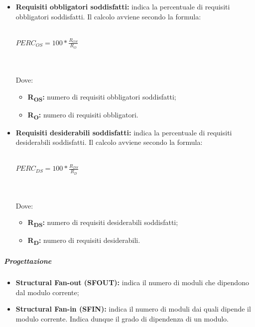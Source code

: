 \begin{itemize}
	\item \textbf{Requisiti obbligatori soddisfatti:} indica la percentuale di requisiti obbligatori soddisfatti. Il calcolo avviene secondo la formula:\\\\
	\centerline{
		\begin{math}
		PERC_{OS}=100*\frac{R_{OS}}{R_O}
		\end{math}
	}
	\\\\Dove:
	\begin{itemize}
		\item \textbf{R\textsubscript{OS}:} numero di requisiti obbligatori soddisfatti;
		\item \textbf{R\textsubscript{O}:} numero di requisiti obbligatori.
	\end{itemize}
	\item \textbf{Requisiti desiderabili soddisfatti:} indica la percentuale di requisiti desiderabili soddisfatti. Il calcolo avviene secondo la formula:\\\\
		\centerline{
		\begin{math}
		PERC_{DS}=100*\frac{R_{DS}}{R_D}
		\end{math}
	}
	\\\\Dove:
	\begin{itemize}
		\item \textbf{R\textsubscript{DS}:} numero di requisiti desiderabili soddisfatti;
		\item \textbf{R\textsubscript{D}:} numero di requisiti desiderabili.
	\end{itemize}
\end{itemize}

\subparagraph*{Progettazione}
\begin{itemize}
	\item \textbf{Structural Fan-out (SFOUT):} indica il numero di moduli che dipendono dal modulo corrente;
	\item \textbf{Structural Fan-in (SFIN):} indica il numero di moduli dai quali dipende il modulo corrente. Indica dunque il grado di dipendenza di un modulo.
\end{itemize}

